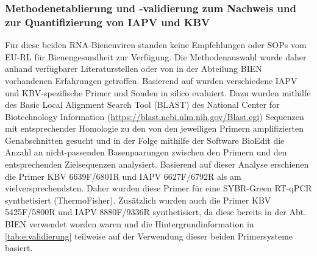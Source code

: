 \subsubsection{Methodenetablierung und -validierung zum Nachweis und zur Quantifizierung von IAPV und KBV} \label{chap:etablierung_iapv_kbv}

Für diese beiden RNA-Bienenviren standen keine Empfehlungen oder SOPs vom EU-RL für Bienengesundheit zur Verfügung. Die Methodenauswahl wurde daher anhand verfügbarer Literaturstellen \citep{coxfoster2007,demiranda2010,maori2007,palacios2008,stoltz1995,chantawannakul2006} oder von in der Abteilung BIEN vorhandenen Erfahrungen getroffen. Basierend auf \citet{demiranda2010} wurden verschiedene IAPV und KBV-spezifische Primer und Sonden in silico evaluiert. Dazu wurden mithilfe des Basic Local Alignment Search Tool (BLAST) des National Center for Biotechnology Information (\url{https://blast.ncbi.nlm.nih.gov/Blast.cgi}) Sequenzen mit entsprechender Homologie zu den von den jeweiligen Primern amplifizierten Genabschnitten gesucht und in der Folge mithilfe der Software BioEdit \citep{hall1999} die Anzahl an nicht-passenden Basenpaarungen zwischen den Primern und den entsprechenden Zielsequenzen analysiert. Basierend auf dieser Analyse erschienen die Primer KBV 6639F/6801R und IAPV 6627F/6792R \citep{demiranda2010} als am vielversprechendsten. Daher wurden diese Primer für eine SYBR-Green RT-qPCR synthetisiert (ThermoFisher). Zusätzlich wurden auch die Primer KBV 5425F/5800R \citep{stoltz1995} und IAPV 8880F/9336R \citep{maori2007} synthetisiert, da diese bereits in der Abt. BIEN verwendet worden waren und die Hintergrundinformation in \cref{tab:e:validierung} teilweise auf der Verwendung dieser beiden Primersysteme basiert.

